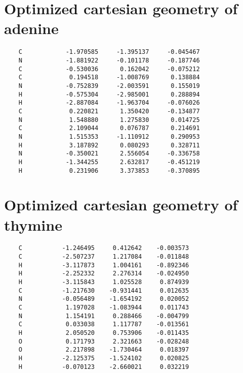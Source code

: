\documentclass[12pt]{article}
\begin{document}
\section{Optimized cartesian geometry of adenine}
{\small
\begin{verbatim}
    C            -1.970585     -1.395137     -0.045467 
    N            -1.881922     -0.101178     -0.187746 
    C            -0.530036      0.162042     -0.075212
    C             0.194518     -1.008769      0.138884 
    N            -0.752839     -2.003591      0.155019 
    H            -0.575304     -2.985001      0.288894 
    H            -2.887084     -1.963704     -0.076026 
    C             0.220821      1.350420     -0.134877 
    N             1.548880      1.275830      0.014725 
    C             2.109044      0.076787      0.214691 
    N             1.515353     -1.110912      0.290953
    H             3.187892      0.080293      0.328711 
    N            -0.350021      2.556054     -0.336758 
    H            -1.344255      2.632817     -0.451219 
    H             0.231906      3.373853     -0.370895 
\end{verbatim}}
\newpage
\section{Optimized cartesian geometry of thymine}
{\small
\begin{verbatim}
    C           -1.246495     0.412642    -0.003573 
    C           -2.507237     1.217084    -0.011848 
    H           -3.117873     1.004161    -0.892346 
    H           -2.252332     2.276314    -0.024950 
    H           -3.115843     1.025528     0.874939 
    C           -1.217630    -0.931441     0.012635 
    N           -0.056489    -1.654192     0.020052 
    C            1.197028    -1.083944     0.011743 
    N            1.154191     0.288466    -0.004799
    C            0.033038     1.117787    -0.013561 
    H            2.050520     0.753906    -0.011435 
    O            0.171793     2.321663    -0.028248 
    O            2.217898    -1.730464     0.018397 
    H           -2.125375    -1.524102     0.020825 
    H           -0.070123    -2.660021     0.032219 
\end{verbatim}}
\newpage
\end{document}

